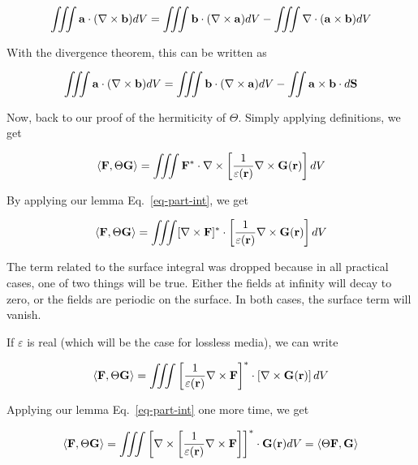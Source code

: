 \begin{equation}
\iiint {\bf a}  \cdot (\nabla \times {\bf b}) dV = \iiint {\bf b} \cdot ( \nabla \times {\bf a}) dV - \iiint \nabla \cdot ({\bf a} \times {\bf b}) dV 
\end{equation} 

With the divergence theorem, this can be written as

\begin{equation}
\iiint {\bf a}  \cdot (\nabla \times {\bf b}) dV = \iiint {\bf b} \cdot ( \nabla \times {\bf a}) dV - \iint  {\bf a} \times {\bf b} \cdot d{\bf S} \label{eq-part-int}
\end{equation} 

Now, back to our proof of the hermiticity of $\Theta$. Simply applying definitions, we get

\begin{equation}
\left\langle {\bf F}, \Theta {\bf G}\right\rangle = \iiint {\bf F}^* \cdot\nabla \times \left[ \frac{1}{\varepsilon({\bf r})}\nabla \times {\bf G({\bf r})}  \right ] dV 
\end{equation} 

By applying our lemma Eq.~\ref{eq-part-int}, we get

\begin{equation}
\left\langle {\bf F}, \Theta {\bf G}\right\rangle = \iiint [ \nabla \times {\bf F}]^* \cdot \left[ \frac{1}{\varepsilon({\bf r})}\nabla \times {\bf G({\bf r})}  \right ] dV 
\label{eq-pos-omega}
\end{equation} 

The term related to the surface integral was dropped because in all practical cases, one of two things will be true. Either the fields at infinity will decay to zero, or the fields are periodic on the surface. In both cases, the surface term will vanish.

If $\varepsilon$ is real (which will be the case for lossless media), we can write

\begin{equation}
\left\langle {\bf F}, \Theta {\bf G}\right\rangle = \iiint \left [\frac{1}{\varepsilon({\bf r})} \nabla \times {\bf F}\right]^* \cdot \left[ \nabla \times {\bf G({\bf r})}  \right ] dV 
\end{equation} 

Applying our lemma Eq.~\ref{eq-part-int} one more time, we get

\begin{equation}
\left\langle {\bf F}, \Theta {\bf G}\right\rangle = \iiint \left[ \nabla \times  \left [\frac{1}{\varepsilon({\bf r})} \nabla \times {\bf F}\right] \right ] ^* \cdot {\bf G({\bf r})}  dV  = \left\langle \Theta {\bf F}, {\bf G}\right\rangle 
\end{equation} 

